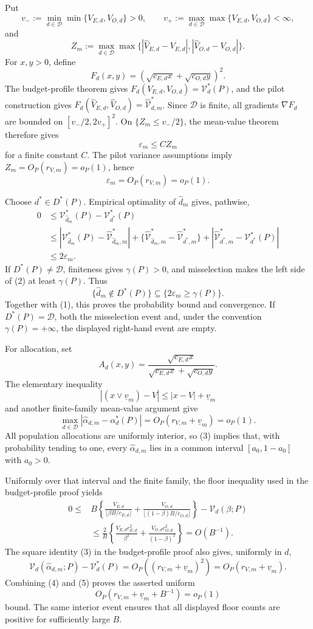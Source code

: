 Put
\[
 v_-:=\min_{d\in\mathcal D}\min\{V_{E,d},V_{O,d}\}>0,
 \qquad
 v_+:=\max_{d\in\mathcal D}\max\{V_{E,d},V_{O,d}\}<\infty,
\]
and
\[
 Z_m:=\max_{d\in\mathcal D}\max\{|\hat V_{E,d}-V_{E,d}|,
 |\hat V_{O,d}-V_{O,d}|\}.
\]
For \(x,y>0\), define
\[
 F_d(x,y)=(\sqrt{c_{E,d}x}+\sqrt{c_{O,d}y})^2.
\]
The budget-profile theorem gives \(F_d(V_{E,d},V_{O,d})=\mathcal V_d^*(P)\), and the pilot construction gives
\(F_d(\hat V_{E,d},\hat V_{O,d})=\hat{\mathcal V}_{d,m}^*\).  Since \(\mathcal D\) is finite, all gradients \(\nabla F_d\) are bounded on \([v_-/2,2v_+]^2\).  On \(\{Z_m\le v_-/2\}\), the mean-value theorem therefore gives
\[
 \varepsilon_m\le C Z_m
\]
for a finite constant \(C\).  The pilot variance assumptions imply \(Z_m=O_P(r_{V,m})=o_P(1)\), hence
\[
 \varepsilon_m=O_P(r_{V,m})=o_P(1). \tag{1}
\]

Choose \(d^*\in D^*(P)\).  Empirical optimality of \(\hat d_m\) gives, pathwise,
\[
\begin{aligned}
0&\le \mathcal V_{\hat d_m}^*(P)-\mathcal V_{d^*}^*(P)\\
&\le |\mathcal V_{\hat d_m}^*(P)-\hat{\mathcal V}_{\hat d_m,m}^*|
 +\{\hat{\mathcal V}_{\hat d_m,m}^*-\hat{\mathcal V}_{d^*,m}^*\}
 +|\hat{\mathcal V}_{d^*,m}^*-\mathcal V_{d^*}^*(P)|\\
&\le2\varepsilon_m. \tag{2}
\end{aligned}
\]
If \(D^*(P)\ne\mathcal D\), finiteness gives \(\gamma(P)>0\), and misselection makes the left side of (2) at least \(\gamma(P)\).  Thus
\[
 \{\hat d_m\notin D^*(P)\}\subseteq\{2\varepsilon_m\ge\gamma(P)\}.
\]
Together with (1), this proves the probability bound and convergence.  If \(D^*(P)=\mathcal D\), both the misselection event and, under the convention \(\gamma(P)=+\infty\), the displayed right-hand event are empty.

For allocation, set
\[
 A_d(x,y)=\frac{\sqrt{c_{E,d}x}}
 {\sqrt{c_{E,d}x}+\sqrt{c_{O,d}y}}.
\]
The elementary inequality
\[
 |(x\vee\underline v_m)-V|\le |x-V|+\underline v_m
\]
and another finite-family mean-value argument give
\[
 \max_{d\in\mathcal D}|\hat\alpha_{d,m}-\alpha_d^*(P)|
 =O_P(r_{V,m}+\underline v_m)=o_P(1). \tag{3}
\]
All population allocations are uniformly interior, so (3) implies that, with probability tending to one, every \(\hat\alpha_{d,m}\) lies in a common interval \([a_0,1-a_0]\) with \(a_0>0\).

Uniformly over that interval and the finite family, the floor inequality used in the budget-profile proof yields
\[
\begin{aligned}
0\le{}&B\left\{\frac{V_{E,d}}{\lfloor\beta B/c_{E,d}\rfloor}
 +\frac{V_{O,d}}{\lfloor(1-\beta)B/c_{O,d}\rfloor}\right\}
 -\mathcal V_d(\beta;P)\\
&\le\frac2B\left\{\frac{V_{E,d}c_{E,d}^2}{\beta^2}
 +\frac{V_{O,d}c_{O,d}^2}{(1-\beta)^2}\right\}=O(B^{-1}). \tag{4}
\end{aligned}
\]
The square identity (3) in the budget-profile proof also gives, uniformly in \(d\),
\[
 \mathcal V_d(\hat\alpha_{d,m};P)-\mathcal V_d^*(P)
 =O_P((r_{V,m}+\underline v_m)^2)
 =O_P(r_{V,m}+\underline v_m). \tag{5}
\]
Combining (4) and (5) proves the asserted uniform
\[
 O_P(r_{V,m}+\underline v_m+B^{-1})=o_P(1)
\]
bound.  The same interior event ensures that all displayed floor counts are positive for sufficiently large \(B\).